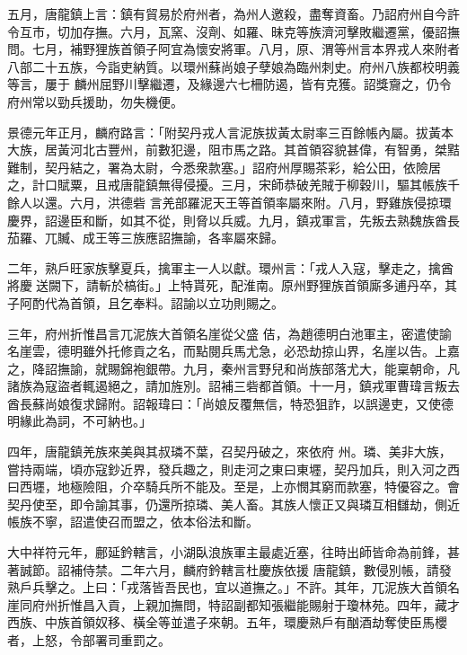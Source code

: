 \begin{pinyinscope}
 五月，唐龍鎮上言：鎮有貿易於府州者，為州人邀殺，盡奪資畜。乃詔府州自今許令互市，切加存撫。六月，瓦窯、沒劑、如羅、昧克等族濟河擊敗繼遷黨，優詔撫問。七月，補野狸族首領子阿宜為懷安將軍。八月，原、渭等州言本界戎人來附者八部二十五族，今詣吏納質。以環州蘇尚娘子孽娘為臨州刺史。府州八族都校明義等言，屢于
 麟州屈野川擊繼遷，及緣邊六七柵防遏，皆有克獲。詔獎齎之，仍令府州常以勁兵援助，勿失機便。



 景德元年正月，麟府路言：「附契丹戎人言泥族拔黃太尉率三百餘帳內屬。拔黃本大族，居黃河北古豐州，前數犯邊，阻市馬之路。其首領容貌甚偉，有智勇，桀黠難制，契丹結之，署為太尉，今悉衆款塞。」詔府州厚賜茶彩，給公田，依險居之，計口賦粟，且戒唐龍鎮無得侵擾。三月，宋師恭破羌賊于柳穀川，驅其帳族千餘人以還。六月，洪德砦
 言羌部羅泥天王等首領率屬來附。八月，野雞族侵掠環慶界，詔邊臣和斷，如其不從，則脅以兵威。九月，鎮戎軍言，先叛去熟魏族酋長茄羅、兀贓、成王等三族應詔撫諭，各率屬來歸。



 二年，熟戶旺家族擊夏兵，擒軍主一人以獻。環州言：「戎人入寇，擊走之，擒酋將慶𡗀送闕下，請斬於槁街。」上特貰死，配淮南。原州野狸族首領廝多逋丹卒，其子阿酌代為首領，且乞奉料。詔諭以立功則賜之。



 三年，府州折惟昌言兀泥族大首領名崖從父盛
 佶，為趙德明白池軍主，密遣使諭名崖雲，德明雖外托修貢之名，而點閱兵馬尤急，必恐劫掠山界，名崖以告。上嘉之，降詔撫諭，就賜錦袍銀帶。九月，秦州言野兒和尚族部落尤大，能稟朝命，凡諸族為寇盜者輒遏絕之，請加旌別。詔補三砦都首領。十一月，鎮戎軍曹瑋言叛去酋長蘇尚娘復求歸附。詔報瑋曰：「尚娘反覆無信，特恐狙詐，以誤邊吏，又使德明緣此為詞，不可納也。」



 四年，唐龍鎮羌族來美與其叔璘不葉，召契丹破之，來依府
 州。璘、美非大族，嘗持兩端，頃亦寇鈔近界，發兵趣之，則走河之東曰東壥，契丹加兵，則入河之西曰西壥，地極險阻，介卒騎兵所不能及。至是，上亦憫其窮而款塞，特優容之。會契丹使至，即令諭其事，仍還所掠璘、美人畜。其族人懷正又與璘互相讎劫，側近帳族不寧，詔遣使召而盟之，依本俗法和斷。



 大中祥符元年，鄜延鈐轄言，小湖臥浪族軍主最處近塞，往時出師皆命為前鋒，甚著誠節。詔補侍禁。二年六月，麟府鈐轄言杜慶族依援
 唐龍鎮，數侵別帳，請發熟戶兵擊之。上曰：「戎落皆吾民也，宜以道撫之。」不許。其年，兀泥族大首領名崖同府州折惟昌入貢，上親加撫問，特詔副都知張繼能賜射于瓊林苑。四年，藏才西族、中族首領奴移、橫全等並遣子來朝。五年，環慶熟戶有酗酒劫奪使臣馬櫻者，上怒，令部署司重罰之。




\end{pinyinscope}
